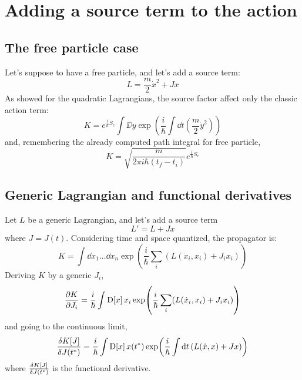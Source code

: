 \documentclass[main.tex]{subfiles}
\begin{document}
\section{Adding a source term to the action}
\subsection{The free particle case}
Let's suppose to have a free particle, and let's add a source term:
\begin{equation}
L = \frac{m}{2} \dot{x}^2 + Jx
\end{equation}
As showed for the quadratic Lagrangians, the source factor affect only the classic action term:
\begin{equation}
K =  e^{\frac{i}{\hbar} S_c }\int \DD{y} \exp( \frac{i}{\hbar} \int \dd{t} (\frac{m}{2}\dot{y}^2) )
\end{equation}
and, remembering the already computed path integral for free particle,
\begin{equation}
K = \sqrt{\frac{m}{2\pi i \hbar (t_f-t_i)}} e^{\frac{i}{\hbar} S_c }
\end{equation}

\subsection{Generic Lagrangian and functional derivatives}
Let $L$ be a generic Lagrangian, and let's add a source term
\begin{equation}
L' = L + Jx
\end{equation}
where $J=J(t)$. Considering time and space quantized, the propagator is:
\begin{equation}
K = \int \dd{x_1}\dots\dd{x_n} \exp(\frac{i}{\hbar} \sum_i (L(\dot{x}_i,x_i) + J_i x_i) )
\end{equation}
Deriving $K$ by a generic $J_i$,
\begin{equation}
\pdv{K}{J_i} = \frac{i}{\hbar}\int \text{D[$x$]}\, x_i \exp( \frac{i}{\hbar} \sum_i (L(\dot{x}_i,x_i) + J_i x_i) ) 
\end{equation}
and going to the continuous limit,
\begin{equation}
\fdv{K[J]}{J(t^*)} = \frac{i}{\hbar}\int \DD{x} x(t^*) \exp(\frac{i}{\hbar} \int \dd{t} (L(\dot{x},x) + J x) )
\end{equation}
where $\fdv{K[J]}{J(t^*)}$ is the functional derivative.
\end{document}
